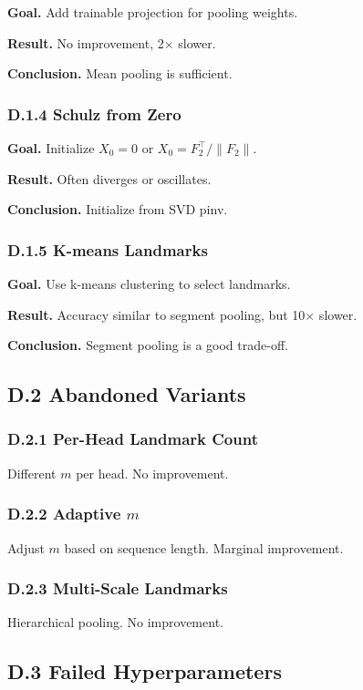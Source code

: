 \textbf{Goal.} Add trainable projection for pooling weights.

\textbf{Result.} No improvement, 2$\times$ slower.

\textbf{Conclusion.} Mean pooling is sufficient.

\subsubsection{D.1.4 Schulz from Zero}

\textbf{Goal.} Initialize $X_0 = 0$ or $X_0 = F_2^\top / \|F_2\|$.

\textbf{Result.} Often diverges or oscillates.

\textbf{Conclusion.} Initialize from SVD pinv.

\subsubsection{D.1.5 K-means Landmarks}

\textbf{Goal.} Use k-means clustering to select landmarks.

\textbf{Result.} Accuracy similar to segment pooling, but 10$\times$ slower.

\textbf{Conclusion.} Segment pooling is a good trade-off.

\subsection{D.2 Abandoned Variants}

\subsubsection{D.2.1 Per-Head Landmark Count}

Different $m$ per head. No improvement.

\subsubsection{D.2.2 Adaptive $m$}

Adjust $m$ based on sequence length. Marginal improvement.

\subsubsection{D.2.3 Multi-Scale Landmarks}

Hierarchical pooling. No improvement.

\subsection{D.3 Failed Hyperparameters}

